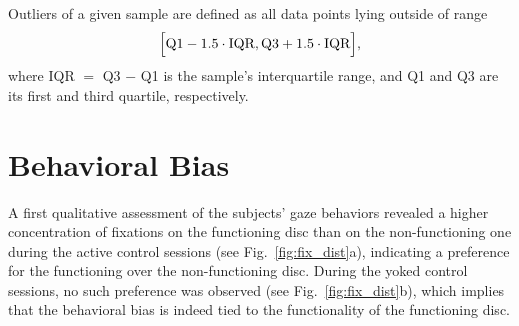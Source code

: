 \documentclass[a4paper]{scrreprt}
\begin{document}
Outliers of a given sample are defined as all data points lying outside of range
\begin{align}
\Bigl[\text{Q1} - 1.5 \cdot \text{IQR}, \text{Q3} + 1.5 \cdot \text{IQR}\Bigr],
\end{align}
where IQR $=$ Q3 $-$ Q1 is the sample's interquartile range, and Q1 and Q3 are its first and third quartile, respectively.



\section{Behavioral Bias}
\label{sec:bias}

A first qualitative assessment of the subjects' gaze behaviors revealed a higher concentration of fixations on the functioning disc than on the non-functioning one during the active control sessions (see Fig.~\ref{fig:fix_dist}a), indicating a preference for the functioning over the non-functioning disc. During the yoked control sessions, no such preference was observed (see Fig.~\ref{fig:fix_dist}b), which implies that the behavioral bias is indeed tied to the functionality of the functioning disc.
\end{document}
